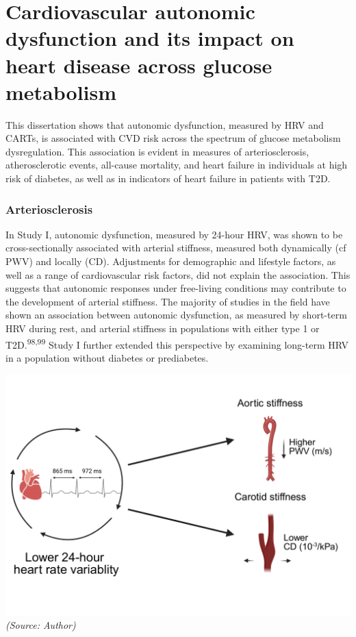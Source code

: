 \documentclass[
  a4paper,
  headsepline=true,
  open=any]{scrbook}
\begin{document}
\hypertarget{cardiovascular-autonomic-dysfunction-and-its-impact-on-heart-disease-across-glucose-metabolism}{%
\section{Cardiovascular autonomic dysfunction and its impact on heart
disease across glucose
metabolism}\label{cardiovascular-autonomic-dysfunction-and-its-impact-on-heart-disease-across-glucose-metabolism}}

This dissertation shows that autonomic dysfunction, measured by HRV and
CARTs, is associated with CVD risk across the spectrum of glucose
metabolism dysregulation. This association is evident in measures of
arteriosclerosis, atherosclerotic events, all-cause mortality, and heart
failure in individuals at high risk of diabetes, as well as in
indicators of heart failure in patients with T2D.

\hypertarget{arteriosclerosis-1}{%
\subsubsection{Arteriosclerosis}\label{arteriosclerosis-1}}

In Study I, autonomic dysfunction, measured by 24-hour HRV, was shown to
be cross-sectionally associated with arterial stiffness, measured both
dynamically (cf PWV) and locally (CD). Adjustments for demographic and
lifestyle factors, as well as a range of cardiovascular risk factors,
did not explain the association. This suggests that autonomic responses
under free-living conditions may contribute to the development of
arterial stiffness. The majority of studies in the field have shown an
association between autonomic dysfunction, as measured by short-term HRV
during rest, and arterial stiffness in populations with either type 1 or
T2D.\textsuperscript{98,99} Study I further extended this perspective by
examining long-term HRV in a population without diabetes or prediabetes.

\includegraphics{images/hrv_arterial_stiffness.pdf} \emph{(Source:
Author)}
\end{document}
